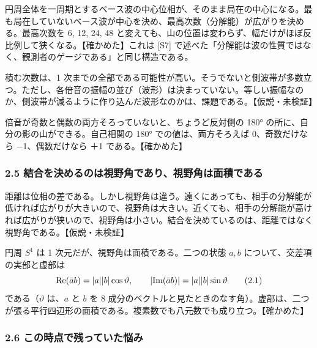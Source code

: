 \documentclass[
  a4paper,
]{ltjsarticle}
\begin{document}
円周全体を一周期とするベース波の中心位相が、そのまま局在の中心になる。最も局在していないベース波が中心を決め、最高次数（分解能）が広がりを決める。最高次数を
6, 12, 24, 48
と変えても、山の位置は変わらず、幅だけがほぼ反比例して狭くなる。【確かめた】これは
{[}S7{]}
で述べた「分解能は波の性質ではなく、観測者のゲージである」と同じ構造である。

積む次数は、1
次までの全部である可能性が高い。そうでないと側波帯が多数立つ。ただし、各倍音の振幅の並び（波形）は決まっていない。等しい振幅なのか、側波帯が減るように作り込んだ波形なのかは、課題である。【仮説・未検証】

倍音が奇数と偶数の両方そろっていないと、ちょうど反対側の 180°
の所に、自分の影の山ができる。自己相関の 180° での値は、両方そろえば
0、奇数だけなら −1、偶数だけなら ＋1 である。【確かめた】

\subsubsection{2.5
結合を決めるのは視野角であり、視野角は面積である}\label{ux7d50ux5408ux3092ux6c7aux3081ux308bux306eux306fux8996ux91ceux89d2ux3067ux3042ux308aux8996ux91ceux89d2ux306fux9762ux7a4dux3067ux3042ux308b}

距離は位相の差である。しかし視野角は違う。遠くにあっても、相手の分解能が低ければ広がりが大きいので、視野角は大きい。近くても、相手の分解能が高ければ広がりが狭いので、視野角は小さい。結合を決めているのは、距離ではなく視野角である。【仮説・未検証】

円周 \(S^1\) は 1 次元だが、視野角は面積である。二つの状態 \(a, b\)
について、交差項の実部と虚部は \[
{\rm Re}(\bar a b) = \lvert a\rvert\lvert b\rvert\cos\vartheta,\qquad \lvert{\rm Im}(\bar a b)\rvert = \lvert a\rvert\lvert b\rvert\sin\vartheta \tag{2.1}
\] である（\(\vartheta\) は、\(a\) と \(b\) を 8
成分のベクトルと見たときのなす角）。虚部は、二つが張る平行四辺形の面積である。複素数でも八元数でも成り立つ。【確かめた】

\subsubsection{2.6
この時点で残っていた悩み}\label{ux3053ux306eux6642ux70b9ux3067ux6b8bux3063ux3066ux3044ux305fux60a9ux307f}
\end{document}
